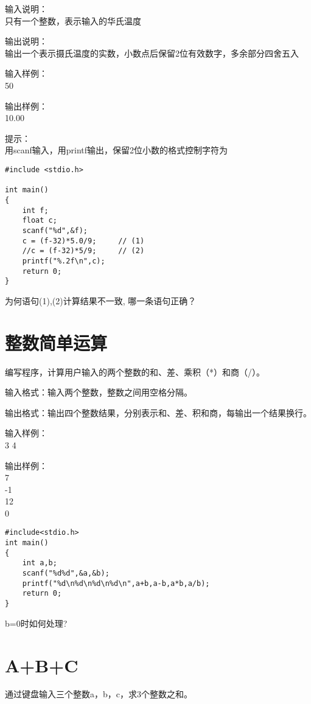 输入说明：\\
只有一个整数，表示输入的华氏温度

输出说明：\\
输出一个表示摄氏温度的实数，小数点后保留2位有效数字，多余部分四舍五入

输入样例：\\
50

输出样例：\\
10.00

提示：\\
用scanf输入，用printf输出，保留2位小数的格式控制字符为%

\begin{lstlisting}
#include <stdio.h>

int main()
{
	int f;
	float c;
	scanf("%d",&f);
	c = (f-32)*5.0/9;     // (1)
	//c = (f-32)*5/9;     // (2)
	printf("%.2f\n",c);
	return 0;
} 
\end{lstlisting}

\begin{note}[思考]
	为何语句(1),(2)计算结果不一致, 哪一条语句正确？
\end{note}


\section{整数简单运算}
编写程序，计算用户输入的两个整数的和、差、乘积（*）和商（/）。

输入格式：输入两个整数，整数之间用空格分隔。

输出格式：输出四个整数结果，分别表示和、差、积和商，每输出一个结果换行。

输入样例：\\
3 4

输出样例：\\
7  \\
-1 \\
12 \\
0

\begin{lstlisting}
#include<stdio.h>
int main()                   
{  
	int a,b;
	scanf("%d%d",&a,&b);
	printf("%d\n%d\n%d\n%d\n",a+b,a-b,a*b,a/b); 
	return 0;           
}             
\end{lstlisting}

\begin{note}[思考]
	b=0时如何处理?
\end{note}

\section{A+B+C}
通过键盘输入三个整数a，b，c，求3个整数之和。

